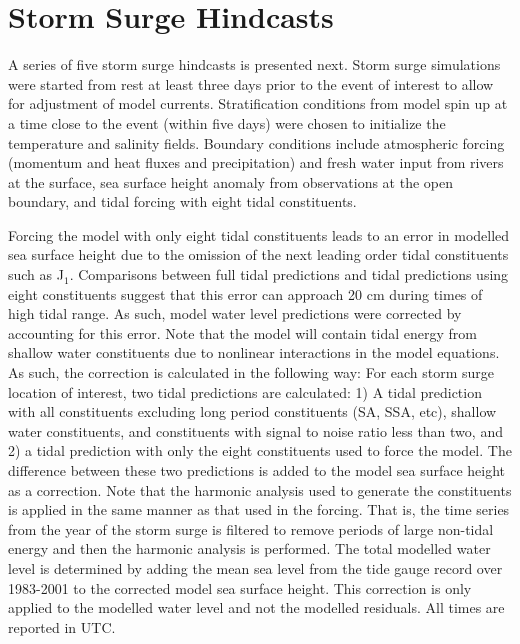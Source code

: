 \documentclass[letterpaper]{tATO2e}
\begin{document}
\section{Storm Surge Hindcasts}\label{sec:storm}
A series of five storm surge hindcasts is presented next. Storm surge simulations were started from rest at least three days prior to the event of interest to allow for adjustment of model currents. Stratification conditions from model spin up at a time close to the event (within five days) were chosen to initialize the temperature and salinity fields. {\color{red} Boundary conditions include atmospheric forcing (momentum and heat fluxes and precipitation) and fresh water input from rivers at the surface, sea surface height anomaly from observations at the open boundary, and tidal forcing with eight tidal constituents.} 


Forcing the model with only eight tidal constituents leads to an error in modelled sea surface height due to the omission of the next leading order tidal constituents such as J$_1$. Comparisons between full tidal predictions and tidal predictions using eight constituents suggest that this error can approach {\color{red} 20} cm during times of high tidal range. {\color{red} As such, model water level predictions were corrected by accounting for this error. Note that the model will contain tidal energy from shallow water constituents due to nonlinear interactions in the model equations. As such, the correction is calculated in the following way:  For each storm surge location of interest, two tidal predictions are calculated: 1) A tidal prediction with all constituents excluding long period constituents (SA, SSA, etc), shallow water constituents, and constituents with signal to noise ratio less than two, and 2) a tidal prediction with only the eight constituents used to force the model.  The difference between these two predictions is added to the model sea surface height as a correction. Note that the harmonic analysis used to generate the constituents is applied in the same manner as that used in the forcing. That is, the time series from the year of the storm surge is filtered to remove periods of large non-tidal energy and then the harmonic analysis is performed. The total modelled water level is determined by adding the mean sea level from the tide gauge record over 1983-2001 to the corrected model sea surface height.} This correction is only applied to the modelled water level and not the modelled residuals. All times are reported in UTC.
\end{document}

